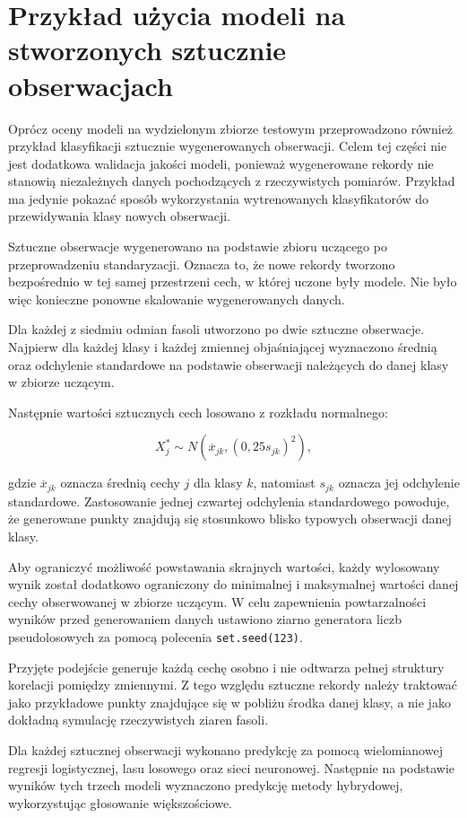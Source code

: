 \documentclass{report}
\begin{document}
\chapter{Przykład użycia modeli na stworzonych sztucznie obserwacjach}

Oprócz oceny modeli na wydzielonym zbiorze testowym przeprowadzono również przykład klasyfikacji sztucznie wygenerowanych obserwacji. Celem tej części nie jest dodatkowa walidacja jakości modeli, ponieważ wygenerowane rekordy nie stanowią niezależnych danych pochodzących z rzeczywistych pomiarów. Przykład ma jedynie pokazać sposób wykorzystania wytrenowanych klasyfikatorów do przewidywania klasy nowych obserwacji.

Sztuczne obserwacje wygenerowano na podstawie zbioru uczącego po przeprowadzeniu standaryzacji. Oznacza to, że nowe rekordy tworzono bezpośrednio w tej samej przestrzeni cech, w której uczone były modele. Nie było więc konieczne ponowne skalowanie wygenerowanych danych.

Dla każdej z siedmiu odmian fasoli utworzono po dwie sztuczne obserwacje. Najpierw dla każdej klasy i każdej zmiennej objaśniającej wyznaczono średnią oraz odchylenie standardowe na podstawie obserwacji należących do danej klasy w zbiorze uczącym.

Następnie wartości sztucznych cech losowano z rozkładu normalnego:

\[
X_j^{*} \sim N\left(\overline{x}_{jk},
\left(0{,}25s_{jk}\right)^2\right),
\]

gdzie $\overline{x}_{jk}$ oznacza średnią cechy $j$ dla klasy $k$, natomiast $s_{jk}$ oznacza jej odchylenie standardowe. Zastosowanie jednej czwartej odchylenia standardowego powoduje, że generowane punkty znajdują się stosunkowo blisko typowych obserwacji danej klasy.

Aby ograniczyć możliwość powstawania skrajnych wartości, każdy wylosowany wynik został dodatkowo ograniczony do minimalnej i maksymalnej wartości danej cechy obserwowanej w zbiorze uczącym. W celu zapewnienia powtarzalności wyników przed generowaniem danych ustawiono ziarno generatora liczb pseudolosowych za pomocą polecenia \texttt{set.seed(123)}.

Przyjęte podejście generuje każdą cechę osobno i nie odtwarza pełnej struktury korelacji pomiędzy zmiennymi. Z tego względu sztuczne rekordy należy traktować jako przykładowe punkty znajdujące się w pobliżu środka danej klasy, a nie jako dokładną symulację rzeczywistych ziaren fasoli.

Dla każdej sztucznej obserwacji wykonano predykcję za pomocą wielomianowej regresji logistycznej, lasu losowego oraz sieci neuronowej. Następnie na podstawie wyników tych trzech modeli wyznaczono predykcję metody hybrydowej, wykorzystując głosowanie większościowe.
\end{document}
